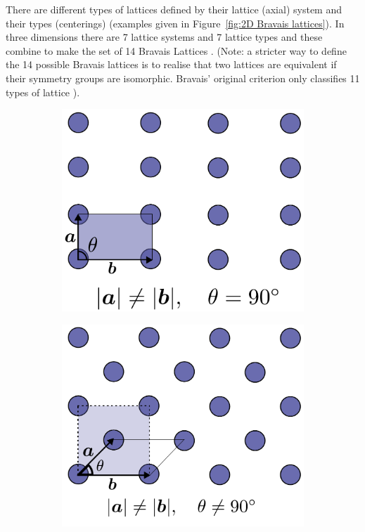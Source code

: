         There are different types of lattices defined by their lattice (axial) system and their types (centerings) (examples given in Figure~\ref{fig:2D Bravais lattices}). In three dimensions there are 7 lattice systems and 7 lattice types and these combine to make the set of 14 Bravais Lattices \cite{bravais1850Lattices}. (Note: a stricter way to define the 14 possible Bravais lattices is to realise that two lattices are equivalent if their symmetry groups are isomorphic. Bravais' original criterion only classifies 11 types of lattice \cite{pitteri1996definition}).
        \begin{figure}
            \centering
            \begin{subfigure}[b]{0.45\textwidth}
                    \centering
                    \includegraphics[width=\textwidth]{figures/introduction/rectangularbravaislattice.pdf}
                    \caption{}
                    \label{fig:2D rectangular Bravais lattice}
            \end{subfigure}
            \qquad
            \begin{subfigure}[b]{0.45\textwidth}
                    \centering
                    \includegraphics[width=\textwidth]{figures/introduction/centredrectangularbravaislattice.pdf}

\end{subfigure}
\end{figure}
